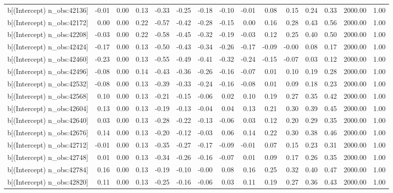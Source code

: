 \begin{table}[ht]
\begin{tabular}{rrrrrrrrrrrrrrr}
  b[(Intercept) n\_obs:42136] & -0.01 & 0.00 & 0.13 & -0.33 & -0.25 & -0.18 & -0.10 & -0.01 & 0.08 & 0.15 & 0.24 & 0.33 & 2000.00 & 1.00 \\ 
  b[(Intercept) n\_obs:42172] & 0.00 & 0.00 & 0.22 & -0.57 & -0.42 & -0.28 & -0.15 & 0.00 & 0.16 & 0.28 & 0.43 & 0.56 & 2000.00 & 1.00 \\ 
  b[(Intercept) n\_obs:42208] & -0.03 & 0.00 & 0.22 & -0.58 & -0.45 & -0.32 & -0.19 & -0.03 & 0.12 & 0.25 & 0.40 & 0.50 & 2000.00 & 1.00 \\ 
  b[(Intercept) n\_obs:42424] & -0.17 & 0.00 & 0.13 & -0.50 & -0.43 & -0.34 & -0.26 & -0.17 & -0.09 & -0.00 & 0.08 & 0.17 & 2000.00 & 1.00 \\ 
  b[(Intercept) n\_obs:42460] & -0.23 & 0.00 & 0.13 & -0.55 & -0.49 & -0.41 & -0.32 & -0.24 & -0.15 & -0.07 & 0.03 & 0.12 & 2000.00 & 1.00 \\ 
  b[(Intercept) n\_obs:42496] & -0.08 & 0.00 & 0.14 & -0.43 & -0.36 & -0.26 & -0.16 & -0.07 & 0.01 & 0.10 & 0.19 & 0.28 & 2000.00 & 1.00 \\ 
  b[(Intercept) n\_obs:42532] & -0.08 & 0.00 & 0.13 & -0.39 & -0.33 & -0.24 & -0.16 & -0.08 & 0.01 & 0.09 & 0.18 & 0.23 & 2000.00 & 1.00 \\ 
  b[(Intercept) n\_obs:42568] & 0.10 & 0.00 & 0.13 & -0.21 & -0.15 & -0.06 & 0.02 & 0.10 & 0.19 & 0.27 & 0.35 & 0.42 & 2000.00 & 1.00 \\ 
  b[(Intercept) n\_obs:42604] & 0.13 & 0.00 & 0.13 & -0.19 & -0.13 & -0.04 & 0.04 & 0.13 & 0.21 & 0.30 & 0.39 & 0.45 & 2000.00 & 1.00 \\ 
  b[(Intercept) n\_obs:42640] & 0.03 & 0.00 & 0.13 & -0.28 & -0.22 & -0.13 & -0.06 & 0.03 & 0.12 & 0.20 & 0.29 & 0.35 & 2000.00 & 1.00 \\ 
  b[(Intercept) n\_obs:42676] & 0.14 & 0.00 & 0.13 & -0.20 & -0.12 & -0.03 & 0.06 & 0.14 & 0.22 & 0.30 & 0.38 & 0.46 & 2000.00 & 1.00 \\ 
  b[(Intercept) n\_obs:42712] & -0.01 & 0.00 & 0.13 & -0.35 & -0.27 & -0.17 & -0.09 & -0.01 & 0.07 & 0.15 & 0.23 & 0.31 & 2000.00 & 1.00 \\ 
  b[(Intercept) n\_obs:42748] & 0.01 & 0.00 & 0.13 & -0.34 & -0.26 & -0.16 & -0.07 & 0.01 & 0.09 & 0.17 & 0.26 & 0.35 & 2000.00 & 1.00 \\ 
  b[(Intercept) n\_obs:42784] & 0.16 & 0.00 & 0.13 & -0.19 & -0.10 & -0.00 & 0.08 & 0.16 & 0.25 & 0.32 & 0.40 & 0.47 & 2000.00 & 1.00 \\ 
  b[(Intercept) n\_obs:42820] & 0.11 & 0.00 & 0.13 & -0.25 & -0.16 & -0.06 & 0.03 & 0.11 & 0.19 & 0.27 & 0.36 & 0.43 & 2000.00 & 1.00 \\ 

\end{tabular}
\end{table}
